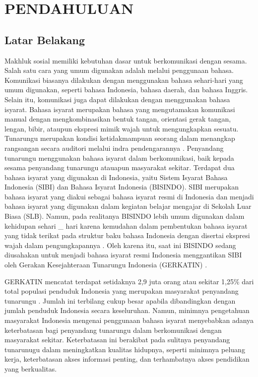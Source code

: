 \chapter{PENDAHULUAN}
\label{chap:pendahuluan}


\section{Latar Belakang}
\label{sec:latarbelakang}
Makhluk sosial memiliki kebutuhan dasar untuk berkomunikasi dengan sesama. Salah satu cara yang umum digunakan adalah melalui penggunaan bahasa. Komunikasi biasanya dilakukan dengan menggunakan bahasa sehari-hari yang umum digunakan, seperti bahasa Indonesia, bahasa daerah, dan bahasa Inggris. Selain itu, komunikasi juga dapat dilakukan dengan menggunakan bahasa isyarat. Bahasa isyarat merupakan bahasa yang mengutamakan komunikasi manual dengan mengkombinasikan bentuk tangan, orientasi gerak tangan, lengan, bibir, ataupun ekspresi mimik wajah untuk mengungkapkan sesuatu. Tunarungu merupakan kondisi ketidakmampuan seorang dalam menangkap rangsangan secara auditori melalui indra pendengarannya \parencite{maulida2017}. Penyandang tunarungu menggunakan bahasa isyarat dalam berkomunikasi, baik kepada sesama penyandang tunarungu atauapun masyarakat sekitar. Terdapat dua bahasa isyarat yang digunakan di Indonesia, yaitu Sistem Isyarat Bahasa Indonesia (SIBI) dan Bahasa Isyarat Indonesia (BISINDO). SIBI merupakan bahasa isyarat yang diakui sebagai bahasa isyarat resmi di Indonesia dan menjadi bahasa isyarat yang digunakan dalam kegiatan belajar mengajar di Sekolah Luar Biasa (SLB). Namun, pada realitanya BISINDO lebih umum digunakan dalam kehidupan sehari \_ hari karena kemudahan dalam pembentukan bahasa isyarat yang tidak terikat pada struktur baku bahasa Indonesia dengan disertai ekspresi wajah dalam pengungkapannya \parencite{handhika2018}. Oleh karena itu, saat ini BISINDO sedang diusahakan untuk menjadi bahasa isyarat resmi Indonesia menggantikan SIBI oleh Gerakan Kesejahteraan Tunarungu Indonesia (GERKATIN) \parencite{borman2018}.

GERKATIN mencatat terdapat setidaknya 2,9 juta orang atau sekitar 1,25\% dari total populasi penduduk Indonesia yang merupakan masyarakat penyandang tunarungu \parencite{evitasari2015}. Jumlah ini terbilang cukup besar apabila dibandingkan dengan jumlah penduduk Indonesia secara keseluruhan. Namun, minimnya pengetahuan masyarakat Indonesia mengenai penggunaan bahasa isyarat menyebabkan adanya keterbatasan bagi penyandang tunarungu dalam berkomunikasi dengan masyarakat sekitar. Keterbatasan ini berakibat pada sulitnya penyandang tunarunugu dalam meningkatkan kualitas hidupnya, seperti minimnya peluang kerja, keterbatasan akses informasi penting, dan terhambatnya akses pendidikan yang berkualitas.

